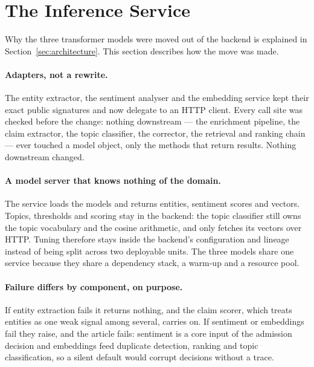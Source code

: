 
\section{The Inference Service}
\label{sec:dev-inference}

Why the three transformer models were moved out of the backend is
explained in Section~\ref{sec:architecture}. This section describes how
the move was made.

\paragraph{Adapters, not a rewrite.} The entity extractor, the
sentiment analyser and the embedding service kept their exact public
signatures and now delegate to an HTTP client. Every call site was
checked before the change: nothing downstream --- the enrichment
pipeline, the claim extractor, the topic classifier, the corrector, the
retrieval and ranking chain --- ever touched a model object, only the
methods that return results. Nothing downstream changed.

\paragraph{A model server that knows nothing of the domain.} The
service loads the models and returns entities, sentiment scores and
vectors. Topics, thresholds and scoring stay in the backend: the topic
classifier still owns the topic vocabulary and the cosine arithmetic,
and only fetches its vectors over HTTP. Tuning therefore stays inside
the backend's configuration and lineage instead of being split across
two deployable units. The three models share one service because they
share a dependency stack, a warm-up and a resource pool.

\paragraph{Failure differs by component, on purpose.} If entity
extraction fails it returns nothing, and the claim scorer, which treats
entities as one weak signal among several, carries on. If sentiment or
embeddings fail they raise, and the article fails: sentiment is a core
input of the admission decision and embeddings feed duplicate
detection, ranking and topic classification, so a silent default would
corrupt decisions without a trace.

